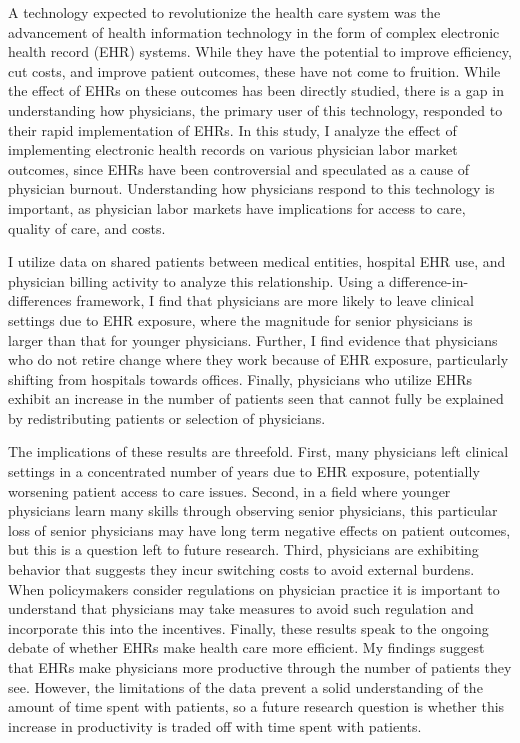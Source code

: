 \documentclass[12pt]{article}
\begin{document}
A technology expected to revolutionize the health care system was the advancement of health information technology in the form of complex electronic health record (EHR) systems. While they have the potential to improve efficiency, cut costs, and improve patient outcomes, these have not come to fruition. While the effect of EHRs on these outcomes has been directly studied, there is a gap in understanding how physicians, the primary user of this technology, responded to their rapid implementation of EHRs. In this study, I analyze the effect of implementing electronic health records on various physician labor market outcomes, since EHRs have been controversial and speculated as a cause of physician burnout. Understanding how physicians respond to this technology is important, as physician labor markets have implications for access to care, quality of care, and costs. 

I utilize data on shared patients between medical entities, hospital EHR use, and physician billing activity to analyze this relationship. Using a difference-in-differences framework, I find that physicians are more likely to leave clinical settings due to EHR exposure, where the magnitude for senior physicians is larger than that for younger physicians. Further, I find evidence that physicians who do not retire change where they work because of EHR exposure, particularly shifting from hospitals towards offices. Finally, physicians who utilize EHRs exhibit an increase in the number of patients seen that cannot fully be explained by redistributing patients or selection of physicians. 

The implications of these results are threefold. First, many physicians left clinical settings in a concentrated number of years due to EHR exposure, potentially worsening patient access to care issues. Second, in a field where younger physicians learn many skills through observing senior physicians, this particular loss of senior physicians may have long term negative effects on patient outcomes, but this is a question left to future research. Third, physicians are exhibiting behavior that suggests they incur switching costs to avoid external burdens. When policymakers consider regulations on physician practice it is important to understand that physicians may take measures to avoid such regulation and incorporate this into the incentives. Finally, these results speak to the ongoing debate of whether EHRs make health care more efficient. My findings suggest that EHRs make physicians more productive through the number of patients they see. However, the limitations of the data prevent a solid understanding of the amount of time spent with patients, so a future research question is whether this increase in productivity is traded off with time spent with patients.  
 
\end{document}
